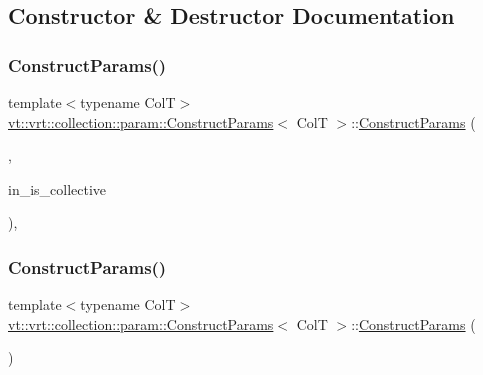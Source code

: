 \subsection{Constructor \& Destructor Documentation}
\mbox{\label{structvt_1_1vrt_1_1collection_1_1param_1_1_construct_params_a41900d135214f06c2d2b4e7c9d9ae1aa}} 
\subsubsection{\texorpdfstring{Construct\+Params()}{ConstructParams()}\hspace{0.1cm}{\footnotesize\ttfamily [1/4]}}
{\footnotesize\ttfamily template$<$typename ColT$>$ \\
\hyperlink{structvt_1_1vrt_1_1collection_1_1param_1_1_construct_params}{vt\+::vrt\+::collection\+::param\+::\+Construct\+Params}$<$ ColT $>$\+::\hyperlink{structvt_1_1vrt_1_1collection_1_1param_1_1_construct_params}{Construct\+Params} (\begin{DoxyParamCaption}\item[{\hyperlink{structvt_1_1vrt_1_1collection_1_1param_1_1_construct_params_1_1_builder_tag}{Builder\+Tag}}]{,  }\item[{bool const}]{in\+\_\+is\+\_\+collective }\end{DoxyParamCaption})\hspace{0.3cm}{\ttfamily [inline]}, {\ttfamily [private]}}

\mbox{\label{structvt_1_1vrt_1_1collection_1_1param_1_1_construct_params_a0ea4f0b3c357c821f2de1147b40b8406}} 
\subsubsection{\texorpdfstring{Construct\+Params()}{ConstructParams()}\hspace{0.1cm}{\footnotesize\ttfamily [2/4]}}
{\footnotesize\ttfamily template$<$typename ColT$>$ \\
\hyperlink{structvt_1_1vrt_1_1collection_1_1param_1_1_construct_params}{vt\+::vrt\+::collection\+::param\+::\+Construct\+Params}$<$ ColT $>$\+::\hyperlink{structvt_1_1vrt_1_1collection_1_1param_1_1_construct_params}{Construct\+Params} (\begin{DoxyParamCaption}{ }\end{DoxyParamCaption})\hspace{0.3cm}{\ttfamily [default]}}


